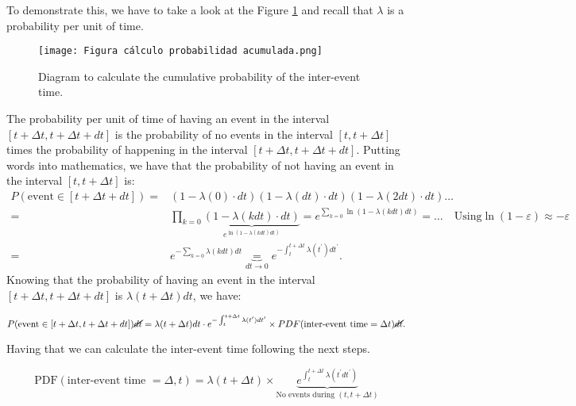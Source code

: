 To demonstrate this, we have to take a look at the Figure \ref{f: Figura calculo probabilidad acumulada} and recall that $\lambda$ is a probability per unit of time.

\begin{figure}[H]
    \centering
    \texttt{[image: Figura cálculo probabilidad acumulada.png]}
    \caption{Diagram to calculate the cumulative probability of the inter-event time.}
    \label{f: Figura calculo probabilidad acumulada}
\end{figure}

The probability per unit of time of having an event in the interval $[t+\Delta t,t+\Delta t+dt]$ is the probability of no events in the interval $[t,t+\Delta t]$ times the probability 
of happening in the interval $[t+\Delta t,t+\Delta t+ dt]$. Putting words into mathematics, we have that the probability of not having an event in the interval $[t,t+\Delta t]$ is:
\begin{equation}
    \begin{split}
        P(\text{event}\in [t+\Delta t+dt])=& \left(1-\lambda(0)\cdot dt \right)\left(1-\lambda(dt)\cdot dt \right)\left(1-\lambda(2dt)\cdot dt \right)\ldots\\
        =& \prod_{k=0}\underbrace{\left(1 -\lambda(k dt)\cdot dt \right)}_{e^{\ln \left(1-\lambda(k dt)dt \right)}}=e^{\sum_{k=0}\ln \left(1-\lambda(k dt) dt \right)}= \ldots\quad \text{Using}  \ln(1-\varepsilon)\approx -\varepsilon\\
        =& e^{-\sum_{k=0}\lambda(kdt)dt}\underbrace{=}_{dt\to 0}e^{-\int_{t}^{t+\Delta t}\lambda(t^\prime)dt^\prime}.
    \end{split}
    \label{eq: probability of no events}
\end{equation} 
Knowing that the probability of having an event in the interval $[t+\Delta t,t+\Delta t+dt]$ is $\lambda(t+\Delta t)dt$, we have:

\begin{equation}
P(\text{event}\in [t+\Delta t,t+\Delta t+dt])\cancel{dt}= \lambda(t+\Delta t)dt\cdot e^{-\int_{t}^{t+\Delta t}\lambda(t^\prime)dt^\prime}\times PDF(\text{inter-event time}=\Delta t)\cancel{dt}.
\label{eq: probability of having an event}
\end{equation}

Having that we can calculate the inter-event time following the next steps. 

$$ \text{PDF}\left( \text{inter-event time } = \Delta,t \right) = \lambda(t+\Delta t)\times \underbrace{e^{\int_{t}^{t+\Delta t}\lambda(t^{\prime}dt^\prime)}}_{\text{No events during }(t,t+\Delta t)}$$

